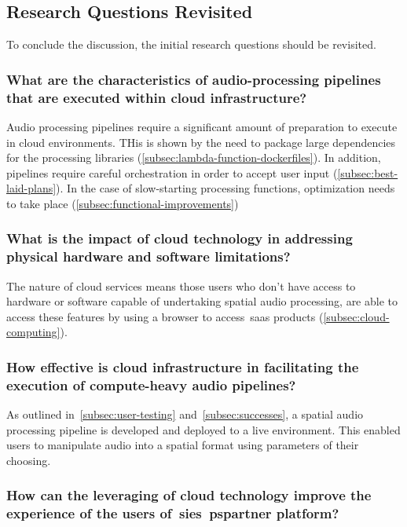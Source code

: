 \subsection{Research Questions Revisited}\label{subsec:research-questions2}

To conclude the discussion, the initial research questions should be revisited.

\subsubsection{What are the characteristics of audio-processing pipelines that are executed within cloud infrastructure?}

Audio processing pipelines require a significant amount of preparation to execute in cloud environments.
THis is shown by the need
to package large dependencies for the processing libraries (\ref{subsec:lambda-function-dockerfiles}).
In addition, pipelines require careful orchestration in order to accept user input (\ref{subsec:best-laid-plans}).
In the case of slow-starting processing functions, optimization needs to take place (\ref{subsec:functional-improvements})

\subsubsection{What is the impact of cloud technology in addressing physical hardware and software limitations?}

The nature of cloud services means those users
who don't have access to hardware or software capable of undertaking spatial audio processing,
are able to access these features by using a browser to access~\gls{saas} products (\ref{subsec:cloud-computing}).

\subsubsection{How effective is cloud infrastructure in facilitating the execution of compute-heavy audio pipelines?}

As outlined in~\ref{subsec:user-testing} and~\ref{subsec:successes},
a spatial audio processing pipeline is developed and deployed to a live environment.
This enabled users to manipulate audio into a spatial format using parameters of their choosing.

\subsubsection{How can the leveraging of cloud technology improve the experience of the users of~\glspl{sie}~\gls{pspartner} platform?}


